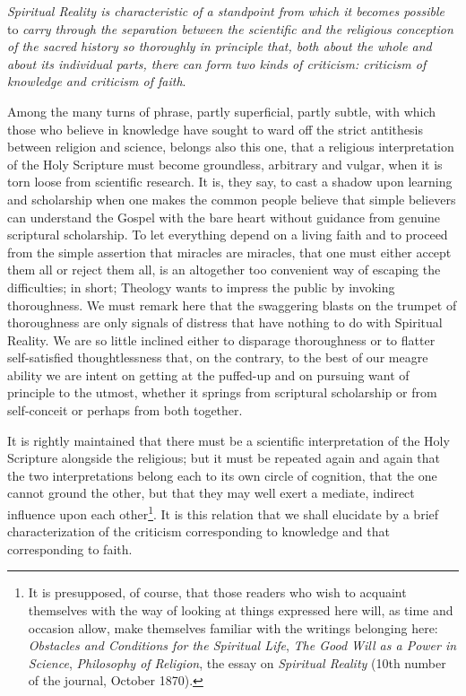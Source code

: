 \documentclass[12pt,a4paper,openany]{book}
\newcommand{\opage}[1]{\marginnote{\footnotesize\textit{[#1]}}}
\begin{document}
\emph{Spiritual Reality is characteristic of a
standpoint from which it becomes possible} to \emph{carry through
the separation between the scientific
and the religious conception of the sacred
history so thoroughly in principle that, both about the
whole and about its individual parts, there can form
two kinds of criticism: criticism of knowledge and criticism of faith}.

Among the many turns of phrase, partly superficial, partly subtle,
with which those who believe in knowledge have sought to
ward off the strict antithesis between religion and science,
belongs also this one, that a religious interpretation of the
Holy Scripture must become groundless, arbitrary and vulgar,
\setcounter{footnote}{0}%
\opage{18}when it is torn loose from scientific research. It is, they
say, to cast a shadow upon learning and scholarship
when one makes the common people believe that simple
believers can understand the Gospel with the bare heart
without guidance from genuine scriptural scholarship. To let everything
depend on a living faith and to proceed from the simple
assertion that miracles are miracles, that one must either
accept them all or reject them all, is an altogether too convenient
way of escaping the difficulties; in short;
Theology wants to impress the public by invoking
thoroughness. We must remark here that the swaggering
blasts on the trumpet of thoroughness are only signals of distress
that have nothing to do with Spiritual Reality. We are
so little inclined either to disparage thoroughness
or to flatter self-satisfied thoughtlessness that, on the contrary,
to the best of our meagre ability we are intent on getting at the puffed-up
and on pursuing want of principle to the utmost, whether
it springs from scriptural scholarship or from self-conceit
or perhaps from both together.

It is rightly maintained that there must be a
scientific interpretation of the Holy Scripture alongside
the religious; but it must be repeated again and again
that the two interpretations belong each to its own circle of cognition,
that the one cannot ground the other, but that they may well
exert a mediate, indirect influence upon each other\footnote[1]{It is presupposed, of course, that those readers who wish to acquaint themselves with the way of looking at things expressed here will, as time and occasion allow, make themselves familiar with the writings belonging here: \emph{Obstacles and Conditions for the Spiritual Life}, \emph{The Good Will as a Power in Science}, \emph{Philosophy of Religion}, the essay on \emph{Spiritual Reality} (10th number of the journal, October 1870).}. It is this relation that we shall elucidate by
\setcounter{footnote}{0}%
\opage{19}a brief characterization of the criticism corresponding to knowledge and that corresponding to faith.
\end{document}
